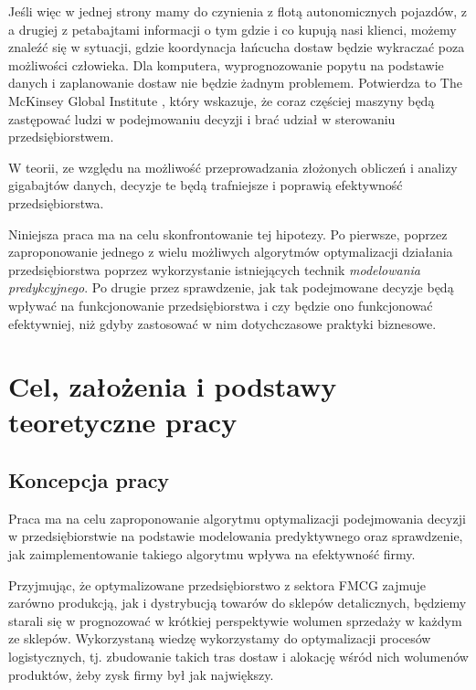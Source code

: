 \documentclass{article}
\begin{document}
Jeśli więc w jednej strony mamy do czynienia z flotą autonomicznych pojazdów, z a drugiej z petabajtami informacji o tym gdzie i co kupują nasi klienci, możemy znaleźć się w sytuacji, gdzie koordynacja łańcucha dostaw będzie wykraczać poza możliwości człowieka. Dla komputera, wyprognozowanie popytu na podstawie danych i zaplanowanie dostaw nie będzie żadnym problemem. Potwierdza to The McKinsey Global Institute \cite{McKinsey&Company2011}, który wskazuje, że coraz częściej maszyny będą zastępować ludzi w podejmowaniu decyzji i brać udział w sterowaniu przedsiębiorstwem. 

W teorii, ze względu na możliwość przeprowadzania złożonych obliczeń i analizy gigabajtów danych, decyzje te będą trafniejsze i poprawią efektywność przedsiębiorstwa. 

Niniejsza praca ma na celu skonfrontowanie tej hipotezy. Po pierwsze, poprzez zaproponowanie jednego z wielu możliwych algorytmów optymalizacji działania przedsiębiorstwa poprzez wykorzystanie istniejących technik \textit{modelowania predykcyjnego}. Po drugie przez sprawdzenie, jak tak podejmowane decyzje będą wpływać na funkcjonowanie przedsiębiorstwa i czy będzie ono funkcjonować efektywniej, niż gdyby zastosować w nim dotychczasowe praktyki biznesowe.

\newpage
 
\tableofcontents

\newpage


\section{Cel, założenia i podstawy teoretyczne pracy}
\subsection{Koncepcja pracy}

Praca ma na celu zaproponowanie algorytmu optymalizacji podejmowania decyzji w przedsiębiorstwie na podstawie modelowania predyktywnego oraz sprawdzenie, jak zaimplementowanie takiego algorytmu wpływa na efektywność firmy.  

Przyjmując, że optymalizowane przedsiębiorstwo z sektora FMCG zajmuje zarówno produkcją, jak i dystrybucją towarów do sklepów detalicznych, będziemy starali się w prognozować w krótkiej perspektywie wolumen sprzedaży w każdym ze sklepów. Wykorzystaną wiedzę wykorzystamy do optymalizacji procesów logistycznych, tj. zbudowanie takich tras dostaw i alokację wśród nich wolumenów produktów, żeby zysk firmy był jak największy. 
\end{document}
